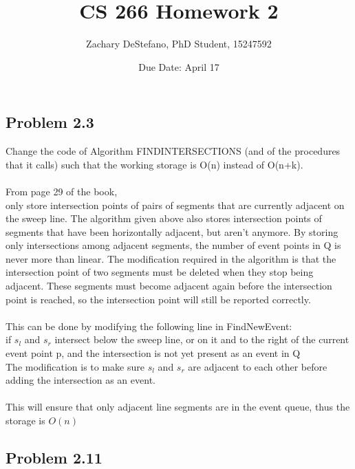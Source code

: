 \documentclass[11pt,psfig]{article}
\begin{document}
\setlength{\parskip}{1.2ex plus0.3ex minus 0.3ex}


\thispagestyle{empty} \pagestyle{myheadings} 



\title{CS 266 Homework 2}
\author{Zachary DeStefano, PhD Student, 15247592}
\date{Due Date: April 17}

\maketitle

\vfill\eject

\subsection*{Problem 2.3}

Change the code of Algorithm FINDINTERSECTIONS (and of the procedures
that it calls) such that the working storage is O(n) instead of
O(n+k).\\
\\
From page 29 of the book, \\
only store intersection
points of pairs of segments that are currently adjacent on the sweep line. The
algorithm given above also stores intersection points of segments that have
been horizontally adjacent, but aren’t anymore. By storing only intersections
among adjacent segments, the number of event points in Q is never more than
linear. The modification required in the algorithm is that the intersection point
of two segments must be deleted when they stop being adjacent. These segments
must become adjacent again before the intersection point is reached, so the
intersection point will still be reported correctly.\\
\\
This can be done by modifying the following line in FindNewEvent:\\
if $s_l$ and $s_r$ intersect below the sweep line, or on it and to the right of the
current event point p, and the intersection is not yet present as an
event in Q
\\
The modification is to make sure $s_l$ and $s_r$ are adjacent to each other before adding the intersection as an event. \\
\\
This will ensure that only adjacent line segments are in the event queue, thus the storage is $O(n)$

\subsection*{Problem 2.11}
\end{document}

